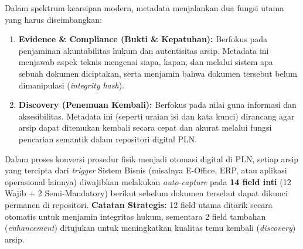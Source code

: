 \documentclass[12pt,a4paper]{report}
\begin{document}
Dalam spektrum kearsipan modern, metadata menjalankan dua fungsi utama yang harus diseimbangkan:
\begin{enumerate}[leftmargin=*]
    \item \textbf{Evidence \& Compliance (Bukti \& Kepatuhan):} Berfokus pada penjaminan akuntabilitas hukum dan autentisitas arsip. Metadata ini menjawab aspek teknis mengenai siapa, kapan, dan melalui sistem apa sebuah dokumen diciptakan, serta menjamin bahwa dokumen tersebut belum dimanipulasi (\textit{integrity hash}).
    \item \textbf{Discovery (Penemuan Kembali):} Berfokus pada nilai guna informasi dan aksesibilitas. Metadata ini (seperti uraian isi dan kata kunci) dirancang agar arsip dapat ditemukan kembali secara cepat dan akurat melalui fungsi pencarian semantik dalam repositori digital PLN.
\end{enumerate}

Dalam proses konversi prosedur fisik menjadi otomasi digital di PLN, setiap arsip yang tercipta dari \textit{trigger} Sistem Bisnis (misalnya E-Office, ERP, atau aplikasi operasional lainnya) diwajibkan melakukan \textit{auto-capture} pada \textbf{14 field inti} (12 Wajib + 2 Semi-Mandatory) berikut sebelum dokumen tersebut dapat dikunci permanen di repositori. \textbf{Catatan Strategis:} 12 field utama ditarik secara otomatis untuk menjamin integritas hukum, sementara 2 field tambahan (\textit{enhancement}) ditujukan untuk meningkatkan kualitas temu kembali (\textit{discovery}) arsip.
\end{document}
